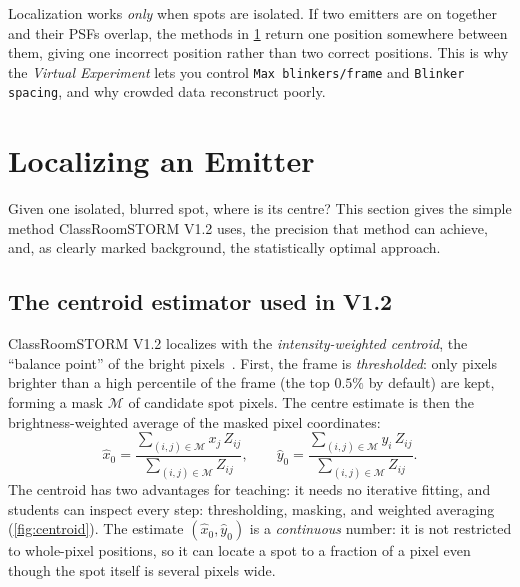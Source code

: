 \documentclass[11pt,a4paper]{article}
\newcommand{\app}{ClassRoomSTORM}
\begin{document}
\begin{csnote}
Localization works \emph{only} when spots are isolated. If two emitters are on
together and their PSFs overlap, the methods in \cref{sec:locating} return one
position somewhere between them, giving one incorrect position rather than two correct positions. This is
why the \emph{Virtual Experiment} lets you control \texttt{Max blinkers/frame}
and \texttt{Blinker spacing}, and why crowded data reconstruct poorly.
\end{csnote}

\section{Localizing an Emitter}
\label{sec:locating}

Given one isolated, blurred spot, where is its centre? This section gives the simple method \app{} V1.2 uses, the precision that method can achieve, and, as clearly marked background, the statistically optimal approach.

\subsection{The centroid estimator used in V1.2}
\label{sec:centroid}

\app{} V1.2 localizes with the \emph{intensity-weighted centroid}, the
``balance point'' of the bright pixels~\cite{small2014}. First, the frame is
\emph{thresholded}: only pixels brighter than a high percentile of the frame
(the top $0.5\%$ by default) are kept, forming a mask $\mathcal{M}$ of candidate spot
pixels. The centre estimate is then the brightness-weighted average of the
masked pixel coordinates:
\begin{equation}
  \hat{x}_0 = \frac{\displaystyle\sum_{(i,j)\in\mathcal{M}} x_j\,Z_{ij}}
                   {\displaystyle\sum_{(i,j)\in\mathcal{M}} Z_{ij}},
  \qquad
  \hat{y}_0 = \frac{\displaystyle\sum_{(i,j)\in\mathcal{M}} y_i\,Z_{ij}}
                   {\displaystyle\sum_{(i,j)\in\mathcal{M}} Z_{ij}}.
  \label{eq:centroid}
\end{equation}
The centroid has two advantages for teaching: it needs no iterative fitting, and
students can inspect every step: thresholding, masking, and weighted averaging
(\cref{fig:centroid}). The estimate $(\hat{x}_0,\hat{y}_0)$ is a
\emph{continuous} number: it is not restricted to whole-pixel positions, so it
can locate a spot to a fraction of a pixel even though the spot itself is
several pixels wide.
\end{document}
